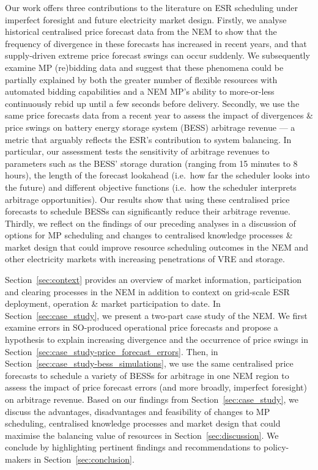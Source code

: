 \documentclass[12pt,a4paper,]{report}
\begin{document}
Our work offers three contributions to the literature on ESR scheduling
under imperfect foresight and future electricity market design. Firstly,
we analyse historical centralised price forecast data from the NEM to
show that the frequency of divergence in these forecasts has increased
in recent years, and that supply-driven extreme price forecast swings
can occur suddenly. We subsequently examine MP (re)bidding data and
suggest that these phenomena could be partially explained by both the
greater number of flexible resources with automated bidding capabilities
and a NEM MP's ability to more-or-less continuously rebid up until a few
seconds before delivery. Secondly, we use the same price forecasts data
from a recent year to assess the impact of divergences \& price swings
on battery energy storage system (BESS) arbitrage revenue --- a metric
that arguably reflects the ESR's contribution to system balancing. In
particular, our assessment tests the sensitivity of arbitrage revenues
to parameters such as the BESS' storage duration (ranging from 15
minutes to 8 hours), the length of the forecast lookahead (i.e.~how far
the scheduler looks into the future) and different objective functions
(i.e.~how the scheduler interprets arbitrage opportunities). Our results
show that using these centralised price forecasts to schedule BESSs can
significantly reduce their arbitrage revenue. Thirdly, we reflect on the
findings of our preceding analyses in a discussion of options for MP
scheduling and changes to centralised knowledge processes \& market
design that could improve resource scheduling outcomes in the NEM and
other electricity markets with increasing penetrations of VRE and
storage.

Section~\ref{sec:context} provides an overview of market information,
participation and clearing processes in the NEM in addition to context
on grid-scale ESR deployment, operation \& market participation to date.
In Section~\ref{sec:case_study}, we present a two-part case study of the
NEM. We first examine errors in SO-produced operational price forecasts
and propose a hypothesis to explain increasing divergence and the
occurrence of price swings in
Section~\ref{sec:case_study-price_forecast_errors}. Then, in
Section~\ref{sec:case_study-bess_simulations}, we use the same
centralised price forecasts to schedule a variety of BESSs for arbitrage
in one NEM region to assess the impact of price forecast errors (and
more broadly, imperfect foresight) on arbitrage revenue. Based on our
findings from Section~\ref{sec:case_study}, we discuss the advantages,
disadvantages and feasibility of changes to MP scheduling, centralised
knowledge processes and market design that could maximise the balancing
value of resources in Section~\ref{sec:discussion}. We conclude by
highlighting pertinent findings and recommendations to policy-makers in
Section~\ref{sec:conclusion}.
\end{document}
